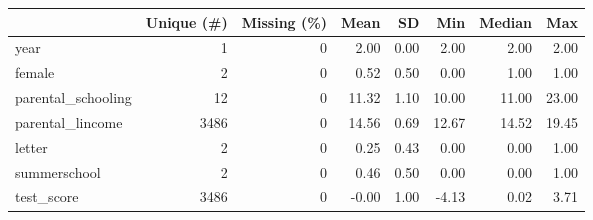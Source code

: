 \begin{table}
\centering
\begin{tabular}[t]{lrrrrrrr}
\toprule
  & Unique (\#) & Missing (\%) & Mean & SD & Min & Median & Max\\
\midrule
year & 1 & 0 & 2.00 & 0.00 & 2.00 & 2.00 & 2.00\\
female & 2 & 0 & 0.52 & 0.50 & 0.00 & 1.00 & 1.00\\
parental\_schooling & 12 & 0 & 11.32 & 1.10 & 10.00 & 11.00 & 23.00\\
parental\_lincome & 3486 & 0 & 14.56 & 0.69 & 12.67 & 14.52 & 19.45\\
letter & 2 & 0 & 0.25 & 0.43 & 0.00 & 0.00 & 1.00\\
summerschool & 2 & 0 & 0.46 & 0.50 & 0.00 & 0.00 & 1.00\\
test\_score & 3486 & 0 & -0.00 & 1.00 & -4.13 & 0.02 & 3.71\\
\bottomrule
\end{tabular}
\end{table}
